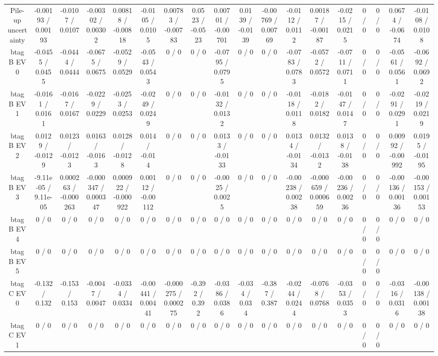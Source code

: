 \documentclass[10pt]{article}
\begin{document}
\begin{table}[htbp]
\begin{center}
\begin{tabular}{|c|c|c|c|c|c|c|c|c|c|c|c|c|c|c|c|c|c|}
  Pile-up uncertainty & -0.00193 / 0.00193 & -0.0107 / 0.0107 & -0.00302 / 0.00302 & 0.00818 / -0.00818 & -0.0105 / 0.0105 & 0.00783 / -0.00783 & 0.0523 / -0.0523 & 0.00701 / -0.00701 & 0.0139 / -0.0139 & -0.00769 / 0.00769 & -0.0112 / 0.0112 & 0.00187 / -0.00187 & -0.0215 / 0.0215 & 0 / 0 & 0 / 0 & 0.0674 / -0.0674 & -0.0108 / 0.0108 \\ 
  btag B EV 0 & -0.0455 / 0.0455 & -0.0444 / 0.0444 & -0.0675 / 0.0675 & -0.0529 / 0.0529 & -0.0543 / 0.0543 & 0 / 0 & 0 / 0 & -0.0795 / 0.0795 & 0 / 0 & 0 / 0 & -0.0783 / 0.0783 & -0.0572 / 0.0572 & -0.0711 / 0.0711 & 0 / 0 & 0 / 0 & -0.0561 / 0.0561 & -0.0692 / 0.0692 \\ 
  btag B EV 1 & -0.0161 / 0.0161 & -0.0167 / 0.0167 & -0.0229 / 0.0229 & -0.0253 / 0.0253 & -0.0249 / 0.0249 & 0 / 0 & 0 / 0 & -0.0132 / 0.0132 & 0 / 0 & 0 / 0 & -0.0118 / 0.0118 & -0.0182 / 0.0182 & -0.0147 / 0.0147 & 0 / 0 & 0 / 0 & -0.0291 / 0.0291 & -0.0219 / 0.0219 \\ 
  btag B EV 2 & 0.0129 / -0.0129 & 0.0123 / -0.0123 & 0.0163 / -0.0163 & 0.0128 / -0.0128 & 0.014 / -0.014 & 0 / 0 & 0 / 0 & 0.0133 / -0.0133 & 0 / 0 & 0 / 0 & 0.0134 / -0.0134 & 0.0132 / -0.0132 & 0.0138 / -0.0138 & 0 / 0 & 0 / 0 & 0.00992 / -0.00992 & 0.0195 / -0.0195 \\ 
  btag B EV 3 & -9.11e-05 / 9.11e-05 & 0.000263 / -0.000263 & -0.000347 / 0.000347 & 0.000922 / -0.000922 & 0.00112 / -0.00112 & 0 / 0 & 0 / 0 & -0.0025 / 0.0025 & 0 / 0 & 0 / 0 & -0.00238 / 0.00238 & -0.000659 / 0.000659 & -0.00236 / 0.00236 & 0 / 0 & 0 / 0 & -0.00136 / 0.00136 & -0.00153 / 0.00153 \\ 
  btag B EV 4 & 0 / 0 & 0 / 0 & 0 / 0 & 0 / 0 & 0 / 0 & 0 / 0 & 0 / 0 & 0 / 0 & 0 / 0 & 0 / 0 & 0 / 0 & 0 / 0 & 0 / 0 & 0 / 0 & 0 / 0 & 0 / 0 & 0 / 0 \\ 
  btag B EV 5 & 0 / 0 & 0 / 0 & 0 / 0 & 0 / 0 & 0 / 0 & 0 / 0 & 0 / 0 & 0 / 0 & 0 / 0 & 0 / 0 & 0 / 0 & 0 / 0 & 0 / 0 & 0 / 0 & 0 / 0 & 0 / 0 & 0 / 0 \\ 
  btag C EV 0 & -0.132 / 0.132 & -0.153 / 0.153 & -0.0047 / 0.0047 & -0.0334 / 0.0334 & -0.00441 / 0.00441 & -0.000275 / 0.000275 & -0.392 / 0.392 & -0.0386 / 0.0386 & -0.034 / 0.034 & -0.387 / 0.387 & -0.0244 / 0.0244 & -0.0768 / 0.0768 & -0.0353 / 0.0353 & 0 / 0 & 0 / 0 & -0.0316 / 0.0316 & -0.00138 / 0.00138 \\ 
  btag C EV 1 & 0 / 0 & 0 / 0 & 0 / 0 & 0 / 0 & 0 / 0 & 0 / 0 & 0 / 0 & 0 / 0 & 0 / 0 & 0 / 0 & 0 / 0 & 0 / 0 & 0 / 0 & 0 / 0 & 0 / 0 & 0 / 0 & 0 / 0 \\ 

\end{tabular}
\end{center}
\end{table}
\end{document}

